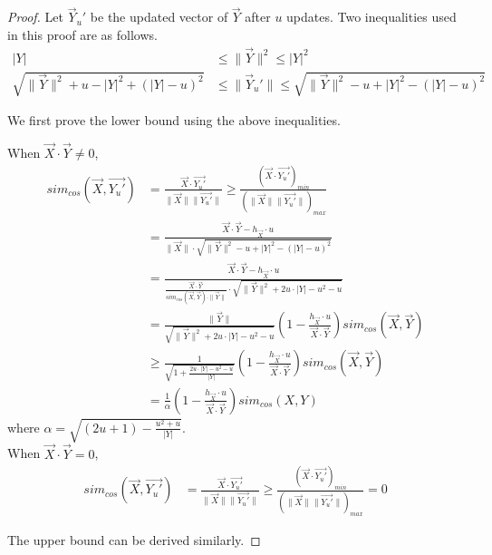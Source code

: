 \begin{proof}
Let $\vec{Y}_u'$ be the updated vector of $\vec{Y}$ after $u$ updates. Two inequalities used in this proof are as follows.
\begin{align} 
|Y| &\leq \|\vec{Y}\|^2 \leq |Y|^2 \\
\sqrt{\|\vec{Y}\|^2+u-|Y|^2+(|Y|-u)^2} &\leq \|\vec{Y}_u'\| \leq \sqrt{\|\vec{Y}\|^2-u+|Y|^2-(|Y|-u)^2} 
\end{align}

We first prove the lower bound using the above inequalities.

When $\vec{X}\cdot \vec{Y} \neq 0$,
\begin{align*}
sim_{cos}(\vec{X}, \vec{Y_u'}) &= \frac{\vec{X}\cdot \vec{Y_u'}}{\|\vec{X}\|\|\vec{Y_u'}\|} \geq \frac{(\vec{X}\cdot \vec{Y_u'})_{min}}{(\|\vec{X}\|\|\vec{Y_u'}\|)_{max}}\\ 
&= \frac{\vec{X} \cdot \vec{Y}-h_{\vec{X}}\cdot u}{\| \vec{X} \|\cdot \sqrt{\|\vec{Y}\|^2-u+|Y|^2-(|Y|-u)^2}}\\
&= \frac{\vec{X} \cdot \vec{Y}-h_{\vec{X}}\cdot u}{\frac{\vec{X} \cdot \vec{Y}}{sim_{cos}(\vec{X}, \vec{Y})\cdot \|\vec{Y}\|}\cdot\sqrt{\|\vec{Y}\|^2+2u\cdot |Y|-u^2-u}} \\
&= \frac{\|\vec{Y}\|}{\sqrt{\|\vec{Y}\|^2+2u\cdot |Y|-u^2-u}}(1-\frac{h_{\vec{X}}\cdot u}{\vec{X}\cdot \vec{Y}})sim_{cos}(\vec{X}, \vec{Y})\\
&\geq \frac{1}{\sqrt{1+\frac{2u\cdot |Y|-u^2-u}{|Y|}}}(1-\frac{h_{\vec{X}}\cdot u}{\vec{X}\cdot \vec{Y}})sim_{cos}(\vec{X}, \vec{Y})\\
&= \frac{1}{\alpha}(1-\frac{h_{\vec{X}}\cdot u}{\vec{X}\cdot \vec{Y}})sim_{cos}(X, Y)
\end{align*}
where $\alpha=\sqrt{(2u+1)-\frac{u^2+u}{|Y|}}$. \\ \newline
\indent When $\vec{X}\cdot \vec{Y} = 0$,
\begin{align*}
sim_{cos}(\vec{X}, \vec{Y_u'}) &= \frac{\vec{X}\cdot \vec{Y_u'}}{\|\vec{X}\|\|\vec{Y_u'}\|} \geq \frac{(\vec{X}\cdot \vec{Y_u'})_{min}}{(\|\vec{X}\|\|\vec{Y_u'}\|)_{max}} = 0
\end{align*}



The upper bound can be derived similarly.


\end{proof}
